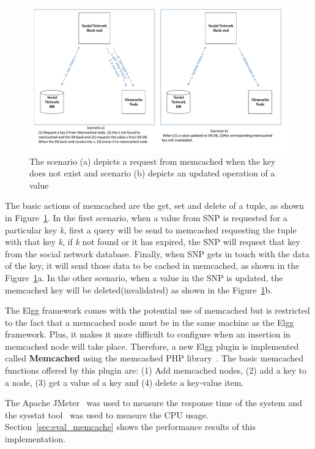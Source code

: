 \begin{figure}[h]
	\centering
	\includegraphics[width=1\textwidth]{./fig/memcached_key_value.pdf}
	\caption{The scenario (a) depicts a request from memcached when the key does not exist and scenario (b) depicts an updated operation of a value}
	\label{fig:memcache_key_value}
\end{figure}

The basic actions of memcached are the get, set and delete of a tuple, as shown in Figure~\ref{fig:memcache_key_value}. In the first scenario, when a value from SNP is requested for a particular key {\it k}, first a query will be send to memcached requesting the tuple with that key {\it k}, if {\it k} not found or it has expired, the SNP will request that key from the social network database. Finally, when SNP gets in touch with the data of the key, it will send those data to be cached in memcached, as shown in the Figure~\ref{fig:memcache_key_value}a. In the other scenario, when a value in the SNP is updated, the memcached key will be deleted(invalidated) as shown in the Figure~\ref{fig:memcache_key_value}b.

The Elgg framework comes with the potential use of memcached but is restricted to the fact that a memcached node must be in the same machine as the Elgg framework. Plus, it makes it more difficult to configure when an insertion in memcached node will take place. Therefore, a new Elgg plugin is implemented called \textbf{Memcached} using the memcached PHP library~\cite{memcached_php_doc}. The basic memcached functions offered by this plugin are: (1) Add memcached nodes, (2) add a key to a node, (3) get a value of a key and (4) delete a key-value item. 

The Apache JMeter~\cite{jmeter_url} was used to measure the response time of the system and the sysstat tool~\cite{sysstat_url} was used to measure the CPU usage. Section~\ref{sec:eval_memcache} 
 shows the performance results of this implementation.


